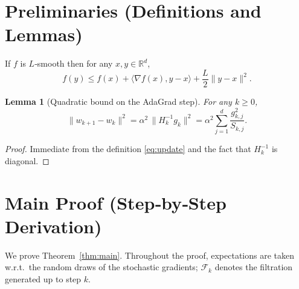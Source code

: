 \documentclass{article}
\newtheorem{lemma}{Lemma}
\begin{document}
\newpage
\section*{Preliminaries (Definitions and Lemmas)}
\begin{definition}
If $f$ is $L$‑smooth then for any $x,y\in\mathbb{R}^{d}$,
\[
f(y)\le f(x)+\langle\nabla f(x),y-x\rangle+\frac{L}{2}\|y-x\|^{2}.
\tag{D1}
\]
\end{definition}
\begin{lemma}[Quadratic bound on the AdaGrad step]\label{lem:step}
For any $k\ge0$,
\[
\|w_{k+1}-w_{k}\|^{2}
= \alpha^{2}\,\bigl\|H_{k}^{-1}g_{k}\bigr\|^{2}
= \alpha^{2}\sum_{j=1}^{d}\frac{g_{k,j}^{2}}{S_{k,j}}.
\tag{L1}
\]
\end{lemma}
\begin{proof}
Immediate from the definition \eqref{eq:update} and the fact that $H_{k}^{-1}$ is diagonal.
\end{proof}

\section*{Main Proof (Step‑by‑Step Derivation)}
We prove Theorem~\ref{thm:main}. Throughout the proof, expectations are taken w.r.t.\ the random draws of the stochastic gradients; $\mathcal{F}_{k}$ denotes the filtration generated up to step $k$.
\end{document}
